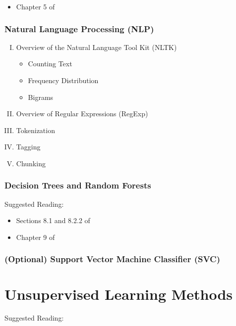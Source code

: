 \documentclass[11pt]{article}
\theoremstyle{plain}
\theoremstyle{definition}
\begin{document}
\begin{itemize}
\item Chapter 5 of \cite{wilmott}
\end{itemize}

\subsubsection{Natural Language Processing (NLP)}

\begin{enumerate}[I.]
\item Overview  of the Natural Language Tool Kit (NLTK)
\begin{itemize}
\item Counting Text
\item Frequency Distribution
\item Bigrams
\end{itemize}
\item Overview of Regular Expressions (RegExp)
\item Tokenization
\item Tagging
\item Chunking

\end{enumerate}




\subsubsection{Decision Trees and Random Forests}

Suggested Reading:

\begin{itemize}
\item Sections 8.1 and 8.2.2 of \cite{ISLR}
\item Chapter 9 of \cite{wilmott}
\end{itemize}

\subsubsection{(Optional) Support Vector Machine Classifier (SVC)}


\newpage

\section{Unsupervised Learning Methods}

Suggested Reading:
\end{document}
